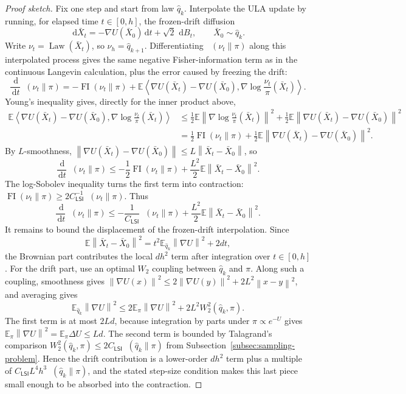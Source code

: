 \documentclass[10pt,a4paper]{amsart}
\numberwithin{equation}{section}
\DeclareMathOperator{\KL}{D_{\mathsf{KL}}}
\DeclareMathOperator{\FI}{FI}
\DeclareMathOperator{\Law}{Law}
\newcommand{\E}{\mathbb{E}}
\newcommand{\dd}{\,\mathrm{d}}
\newcommand{\wh}[1]{\widehat{#1}}
\newcommand{\norm}[1]{\left\lVert #1 \right\rVert}
\newcommand{\ip}[2]{\left\langle #1,#2 \right\rangle}
\begin{document}
\begin{proof}[Proof sketch]
Fix one step and start from law $\wh q_k$.  Interpolate the ULA update by
running, for elapsed time $t\in[0,h]$, the frozen-drift diffusion
\[
    \dd \bar X_t=-\nabla U(\bar X_0)\dd t+\sqrt2\,\dd B_t,
    \qquad \bar X_0\sim \wh q_k.
\]
Write $\nu_t=\Law(\bar X_t)$, so $\nu_h=\wh q_{k+1}$.  Differentiating
$\KL(\nu_t\|\pi)$ along this interpolated process gives the same negative
Fisher-information term as in the continuous Langevin calculation, plus the
error caused by freezing the drift:
\[
    \frac{\dd}{\dd t}\KL(\nu_t\|\pi)
    =
    -\FI(\nu_t\|\pi)
    +
    \E\ip{\nabla U(\bar X_t)-\nabla U(\bar X_0)}
    {\nabla\log \frac{\nu_t}{\pi}(\bar X_t)}.
\]
Young's inequality gives, directly for the inner product above,
\begin{align*}
    \E\ip{\nabla U(\bar X_t)-\nabla U(\bar X_0)}
    {\nabla\log \frac{\nu_t}{\pi}(\bar X_t)}
    &\leq
    \frac12\E\norm{\nabla\log \frac{\nu_t}{\pi}(\bar X_t)}^2
    +
    \frac12\E\norm{\nabla U(\bar X_t)-\nabla U(\bar X_0)}^2 \\
    &=
    \frac12\FI(\nu_t\|\pi)
    +
    \frac12\E\norm{\nabla U(\bar X_t)-\nabla U(\bar X_0)}^2.
\end{align*}
By $L$-smoothness,
$\norm{\nabla U(\bar X_t)-\nabla U(\bar X_0)}
\leq L\norm{\bar X_t-\bar X_0}$, so
\[
    \frac{\dd}{\dd t}\KL(\nu_t\|\pi)
    \leq
    -\frac12\FI(\nu_t\|\pi)
    +
    \frac{L^2}{2}\E\norm{\bar X_t-\bar X_0}^2.
\]
The log-Sobolev inequality turns the first term into contraction:
$\FI(\nu_t\|\pi)\geq 2C_{\mathsf{LSI}}^{-1}\KL(\nu_t\|\pi)$.  Thus
\[
    \frac{\dd}{\dd t}\KL(\nu_t\|\pi)
    \leq
    -\frac{1}{C_{\mathsf{LSI}}}\KL(\nu_t\|\pi)
    +
    \frac{L^2}{2}\E\norm{\bar X_t-\bar X_0}^2.
\]
It remains to bound the displacement of the frozen-drift interpolation.  Since
\[
    \E\norm{\bar X_t-\bar X_0}^2
    =
    t^2\E_{\wh q_k}\norm{\nabla U}^2+2dt,
\]
the Brownian part contributes the local $d h^2$ term after integration over
$t\in[0,h]$.  For the drift part, use an optimal $W_2$ coupling between
$\wh q_k$ and $\pi$.  Along such a coupling, smoothness gives
$\norm{\nabla U(x)}^2\leq
2\norm{\nabla U(y)}^2+2L^2\norm{x-y}^2$, and averaging gives
\[
    \E_{\wh q_k}\norm{\nabla U}^2
    \leq
    2\E_\pi\norm{\nabla U}^2+2L^2W_2^2(\wh q_k,\pi).
\]
The first term is at most $2Ld$, because integration by parts under
$\pi\propto e^{-U}$ gives
$\E_\pi\norm{\nabla U}^2=\E_\pi\Delta U\leq Ld$.  The second term is bounded by
Talagrand's comparison
$W_2^2(\wh q_k,\pi)\leq 2C_{\mathsf{LSI}}\KL(\wh q_k\|\pi)$ from
Subsection~\ref{subsec:sampling-problem}.  Hence the drift contribution is a
lower-order $d h^2$ term plus a multiple of
$C_{\mathsf{LSI}}L^4h^3\KL(\wh q_k\|\pi)$, and the stated step-size condition
makes this last piece small enough to be absorbed into the contraction.


\end{proof}
\end{document}

